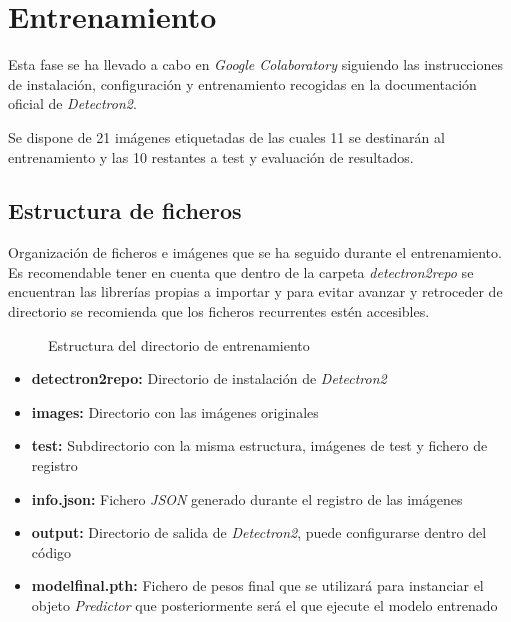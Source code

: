 \section{Entrenamiento}
Esta fase se ha llevado a cabo en \emph{Google Colaboratory} siguiendo las instrucciones de instalación, configuración y entrenamiento recogidas en la documentación oficial de \emph{Detectron2}\cite{DT2:Documentacion}.

Se dispone de 21 imágenes etiquetadas de las cuales 11 se destinarán al entrenamiento y las 10 restantes a test y evaluación de resultados.

\subsection{Estructura de ficheros}

Organización de ficheros e imágenes que se ha seguido durante el entrenamiento. Es recomendable tener en cuenta que dentro de la carpeta \emph{detectron2\textunderscore repo} se encuentran las librerías propias a importar y para evitar avanzar y retroceder de directorio se recomienda que los ficheros recurrentes estén accesibles.

\begin{figure}[h]
	\caption{Estructura del directorio de entrenamiento}
	\label{estructuraentrenamiento}
\end{figure}

\clearpage

\begin{itemize}
    \item \textbf{detectron2\textunderscore repo:} Directorio de instalación de \emph{Detectron2}
    \item \textbf{images:} Directorio con las imágenes originales
    \item \textbf{test:} Subdirectorio con la misma estructura, imágenes de test y fichero de registro
    \item \textbf{info.json:} Fichero \emph{JSON} generado durante el registro de las imágenes
    \item \textbf{output:} Directorio de salida de \emph{Detectron2}, puede configurarse dentro del código
    \item \textbf{model\textunderscore final.pth:} Fichero de pesos final que se utilizará para instanciar el objeto \emph{Predictor} que posteriormente será el que ejecute el modelo entrenado
\end{itemize}

